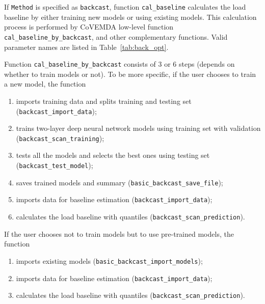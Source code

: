 \documentclass[11pt]{article}
\newcommand{\covemda}{CoVEMDA}
\numberwithin{equation}{section}
\numberwithin{table}{section}
\numberwithin{figure}{section}
\begin{document}
If \verb!Method! is specified as \verb!backcast!, function \verb!cal_baseline! calculates the load baseline by either training new models or using existing models. This calculation process is performed by \covemda{} low-level function \verb!cal_baseline_by_backcast!, and other complementary functions. Valid parameter names are listed in Table~\ref{tab:back_opt}.

Function \verb!cal_baseline_by_backcast! consists of 3 or 6 steps (depends on whether to train models or not). To be more specific, if the user chooses to train a new model, the function

\begin{enumerate}
    \item imports training data and splits training and testing set (\verb!backcast_import_data!);
    \item trains two-layer deep neural network models using training set with validation (\verb!backcast_scan_training!);
    \item tests all the models and selects the best ones using testing set (\verb!backcast_test_model!);
    \item saves trained models and summary (\verb!basic_backcast_save_file!);
    \item imports data for baseline estimation (\verb!backcast_import_data!);
    \item calculates the load baseline with quantiles (\verb!backcast_scan_prediction!).
\end{enumerate}

If the user chooses not to train models but to use pre-trained models, the function

\begin{enumerate}
    \item imports existing models (\verb!basic_backcast_import_models!);
    \item imports data for baseline estimation (\verb!backcast_import_data!);
    \item calculates the load baseline with quantiles (\verb!backcast_scan_prediction!).
\end{enumerate}
\end{document}
